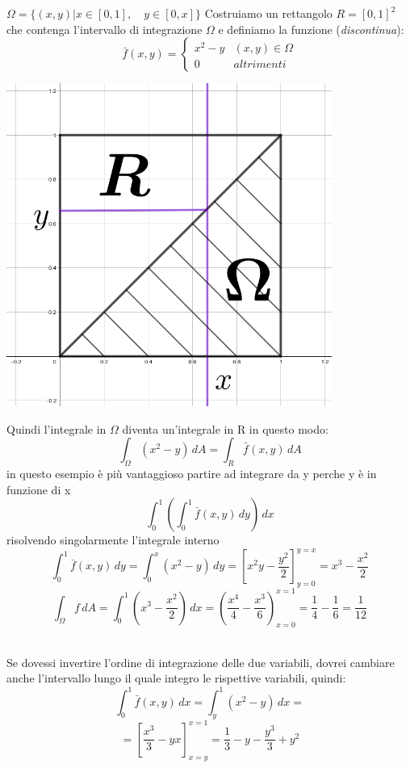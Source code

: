 \documentclass[10pt]{article}
\theoremstyle{plain}
\theoremstyle{definition}
\begin{document}
\begin{minipage}{.5\textwidth}
$\Omega = \{ (x,y) | x \in [0,1], \quad y \in [0,x] \}$
Costruiamo un rettangolo $R=[0,1]^2$ che contenga l'intervallo di integrazione $\Omega$ e definiamo la funzione (\textit{discontinua}):
$$\bar{f}(x,y) = \begin{cases} x^2 - y & (x,y) \in \Omega \\ 0 & altrimenti \end{cases}$$
\end{minipage}%
\begin{minipage}{.50\textwidth}
\centering
\includegraphics[width=0.8\textwidth]{fig1_libo.jpg}
\end{minipage}
\newline
Quindi l'integrale in $\Omega$ diventa un'integrale in R in questo modo:
$$\int_{\Omega} (x^2-y) \,dA = \int_{R} \bar{f} (x,y) \,dA$$
in questo esempio è più vantaggioso partire ad integrare da y perche y è in funzione di x
$$\int_0^1 \left( \int_0^1 \bar{f}(x,y)\,dy\right)\,dx$$
risolvendo singolarmente l'integrale interno
$$\int_0^1 \bar{f}(x,y)\,dy = \int_0^x (x^2-y)\,dy = \left[ x^2y-\frac{y^2}{2} \right]_{y=0}^{y=x} = x^3-\frac{x^2}{2}$$
$$\int_{\Omega} f\,dA = \int_0^1 \left( x^3 - \frac{x^2}{2}\right)\,dx = \left( \frac{x^4}{4} - \frac{x^3}{6} \right)_{x=0}^{x=1} = \frac{1}{4} - \frac{1}{6} = \frac{1}{12}$$
\\
\begin{minipage}{.5\textwidth}
Se dovessi invertire l'ordine di integrazione delle due variabili, dovrei cambiare anche l'intervallo lungo il quale integro le rispettive variabili, quindi:
$$\int_0^1 \bar{f}(x,y)\,dx = \int_y^1 (x^2 - y) \,dx =$$
$$=\left[ \frac{x^3}{3} - yx \right]_{x=y}^{x=1} = \frac{1}{3} -y -\frac{y^3}{3} +y^2$$

\bigskip
\end{minipage}%
\end{document}
